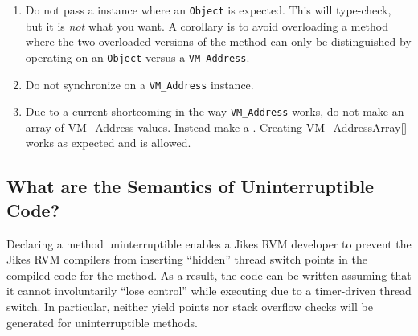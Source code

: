 \begin{enumerate}
\item{} Do not pass a   instance where an {\tt Object}
is expected. This will type-check, but it is {\em not} what you want.  A
corollary is to avoid overloading a method where the two overloaded
versions of the method can only be distinguished by operating on an
{\tt Object}  versus a {\tt VM\_Address}. 
\item{} Do not synchronize on a {\tt VM\_Address} instance.
\item{} Due to a current shortcoming in the way {\tt VM\_Address} works, do not make an
array of {VM\_Address} values.  Instead make a
.
  Creating {VM\_AddressArray[]} works as expected and is allowed.
\end{enumerate}


\subsection{What are the Semantics of Uninterruptible Code?\label{uninterruptible_code}}%
%
%
%
%
%
%
%

Declaring a method uninterruptible enables a Jikes RVM developer to
prevent the Jikes RVM compilers from inserting ``hidden'' thread
switch points in the compiled code for the method.  As a result, the
code can be written assuming that it cannot involuntarily ``lose
control'' while executing due to a timer-driven thread switch. In
particular, neither yield points nor stack overflow
checks will be generated for uninterruptible methods. 

